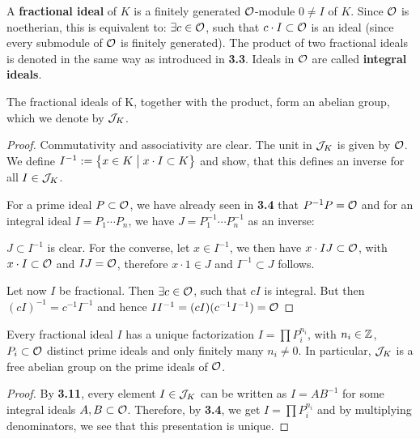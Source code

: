 \begin{defi}
	A \textbf{fractional ideal} of $K$ is a finitely generated $\mathcal{O}$-module $0 \neq I$ of $K$.
	Since $\mathcal{O}$ is noetherian, this is equivalent to: $\exists c \in \mathcal{O}$, such that $c \cdot I \subset \mathcal{O}$ is an ideal (since every submodule of $\mathcal{O}$ is finitely generated).
	The product of two fractional ideals is denoted in the same way as introduced in \textbf{3.3}.
	Ideals in $\mathcal{O}$ are called \textbf{integral ideals}.
\end{defi}

\begin{Satz}
	The fractional ideals of K, together with the product, form an abelian group, which we denote by $\mathcal{J}_K$.
\end{Satz}
\begin{proof}
	Commutativity and associativity are clear.
	The unit in $\mathcal{J}_K$ is given by $\mathcal{O}$.
	We define $I^{-1} := \left\{ {x \in K} \bigm| {x \cdot I \subset K} \right\}$ and show, that this defines an inverse for all $I \in \mathcal{J}_K$.
	
	\bigskip
		
	For a prime ideal $P \subset \mathcal{O}$, we have already seen in \textbf{3.4} that $P^{-1}P = \mathcal{O}$ and for an integral ideal $I = P_1 \cdots P_n$, we have $J = P_1^{-1} \cdots P_n^{-1}$ as an inverse:
	
	\bigskip
		
	$J \subset I^{-1}$ is clear.
	For the converse, let $x \in I^{-1}$, we then have $x \cdot IJ\subset \mathcal{O}$, with $x \cdot I \subset \mathcal{O}$ and $IJ = \mathcal{O}$, therefore $x \cdot 1 \in J$ and $I^{-1} \subset J$ follows.
		
	Let now $I$ be fractional. Then $\exists c \in \mathcal{O}$, such that $cI$ is integral.
	But then $(cI)^{-1} = c^{-1}I^{-1}$ and hence $II^{-1} = (cI)(c^{-1}I^{-1}) = \mathcal{O}$
\end{proof}

\begin{Kor}
	Every fractional ideal $I$ has a unique factorization $I = \prod P_i^{n_i}$, with $n_i \in \mathbb{Z}$, $P_i \subset \mathcal{O}$ distinct prime ideals and only finitely many $n_i \neq 0$. In particular, $\mathcal{J}_K$ is a free abelian group on the prime ideals of $\mathcal{O}$.
\end{Kor}
\begin{proof}
	By \textbf{3.11}, every element $I \in \mathcal{J}_K$ can be written as $I = AB^{-1}$ for some integral ideals $A, B \subset \mathcal{O}$. Therefore, by \textbf{3.4}, we get $I = \prod P_i^{n_i}$ and by multiplying denominators, we see that this presentation is unique.
\end{proof}

